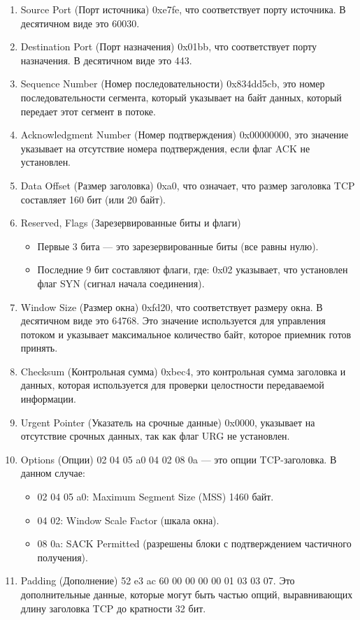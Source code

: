 \begin{enumerate}
	\item Source Port (Порт источника) 0xe7fe,
		что соответствует порту источника. В десятичном виде это 60030.
	\item Destination Port (Порт назначения) 0x01bb,
		что соответствует порту назначения. В десятичном виде это 443.
	\item Sequence Number (Номер последовательности) 0x834dd5cb,
		это номер последовательности сегмента,
		который указывает на байт данных,
		который передает этот сегмент в потоке.
	\item Acknowledgment Number (Номер подтверждения) 0x00000000,
		это значение указывает на отсутствие номера подтверждения,
		если флаг ACK не установлен.
	\item Data Offset (Размер заголовка) 0xa0, что означает,
		что размер заголовка TCP составляет 160 бит (или 20 байт).
	\item Reserved, Flags (Зарезервированные биты и флаги)
		\begin{itemize}
			\item Первые 3 бита --- это зарезервированные биты
				(все равны нулю).
			\item Последние 9 бит составляют флаги,
				где: 0x02 указывает, что установлен флаг SYN
				(сигнал начала соединения).
		\end{itemize}
	\item Window Size (Размер окна) 0xfd20, что соответствует размеру окна.
		В десятичном виде это 64768.
		Это значение используется для управления потоком
		и указывает максимальное количество байт,
		которое приемник готов принять.
	\item Checksum (Контрольная сумма) 0xbec4,
		это контрольная сумма заголовка и данных,
		которая используется для проверки целостности передаваемой информации.
	\item Urgent Pointer (Указатель на срочные данные) 0x0000,
		указывает на отсутствие срочных данных, так как флаг URG не установлен.
	\item Options (Опции) 02 04 05 a0 04 02 08 0a --- это опции TCP-заголовка.
		В данном случае:
		\begin{itemize}
			\item 02 04 05 a0: Maximum Segment Size (MSS) 1460 байт.
			\item 04 02: Window Scale Factor (шкала окна).
			\item 08 0a: SACK Permitted
				(разрешены блоки с подтверждением частичного получения).
		\end{itemize}
	\item Padding (Дополнение) 52 e3 ac 60 00 00 00 00 01 03 03 07.
		Это дополнительные данные, которые могут быть частью опций,
		выравнивающих длину заголовка TCP до кратности 32 бит.
\end{enumerate}

